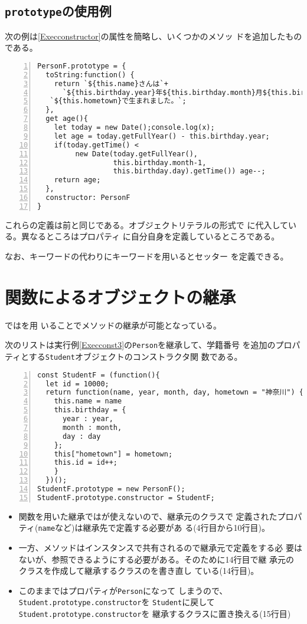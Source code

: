  \subsection{\protect\texttt{prototype}の使用例}
 \begin{Exec}\upshape\label{ExecConst2}
  次の例は\ref{Execconstructor}の属性を簡略し、いくつかのメソッ
 ドを追加したものである。
\begin{Verbatim}[numbers=left]
PersonF.prototype = {
  toString:function() {
    return `${this.name}さんは`+
      `${this.birthday.year}年${this.birthday.month}月${this.birthday.day}日に` +
   `${this.hometown}で生まれました。`;
  },
  get age(){
    let today = new Date();console.log(x);
    let age = today.getFullYear() - this.birthday.year;
    if(today.getTime() <
         new Date(today.getFullYear(),
                  this.birthday.month-1,
                  this.birthday.day).getTime()) age--;
    return age;
  },
  constructor: PersonF
}
\end{Verbatim}
 \end{Exec}
これらの定義は前と同じである。オブジェクトリテラルの形式で
に代入している。異なるところはプロパティ
に自分自身を定義しているところである。

なお、キーワードの代わりにキーワードを用いるとセッター
を定義できる。

\section{関数によるオブジェクトの継承}
\JS ではを用
いることでメソッドの継承が可能となっている。
\begin{Exec}\upshape\label{Execconst4}
次のリストは実行例\ref{Execconst3}の\texttt{Person}を継承して、学籍番号
 を追加のプロパティとする\texttt{Student}オブジェクトのコンストラクタ関
 数である。
\begin{Verbatim}[numbers=left]
const StudentF = (function(){
  let id = 10000;
  return function(name, year, month, day, hometown = "神奈川") {
    this.name = name
    this.birthday = {
      year : year,
      month : month,
      day : day
    };
    this["hometown"] = hometown;
    this.id = id++;
    }
  })();
StudentF.prototype = new PersonF();
StudentF.prototype.constructor = StudentF;
\end{Verbatim}
\end{Exec}
\begin{itemize}
 \item 関数を用いた継承ではが使えないので、継承元のクラスで
       定義されたプロパティ(\texttt{name}など)は継承先で定義する必要があ
       る(4行目から10行目)。
 \item 一方、メソッドはインスタンスで共有されるので継承元で定義をする必
       要はないが、参照できるようにする必要がある。そのために14行目で継
       承元のクラスを作成して継承するクラスのを書き直し
       ている(14行目)。
 \item このままではプロパティが\texttt{Person}になって
       しまうので、\texttt{Student.prototype.constructor}を
       \texttt{Student}に戻して\texttt{Student.prototype.constructor}を
       継承するクラスに置き換える(15行目)
\end{itemize}
